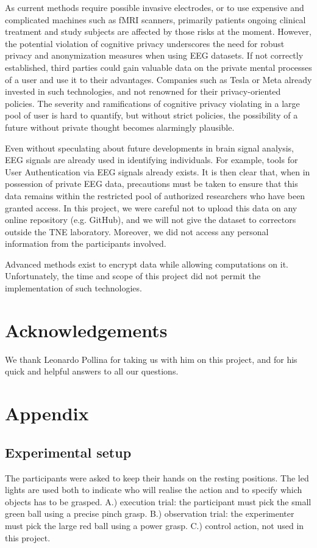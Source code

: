 \documentclass[10pt,conference,compsocconf]{IEEEtran}
\begin{document}
As current methods require possible invasive electrodes, or to use expensive and complicated machines such as fMRI scanners, primarily patients ongoing clinical treatment and study subjects are affected by those risks at the moment. However, the potential violation of cognitive privacy underscores the need for robust privacy and anonymization measures when using EEG datasets. If not correctly established, third parties could gain valuable data on the private mental processes of a user and use it to their advantages. Companies such as Tesla or Meta already invested in such technologies, and not renowned for their privacy-oriented policies. The severity and ramifications of cognitive privacy violating in a large pool of user is hard to quantify, but without strict policies, the possibility of a future without private thought becomes alarmingly plausible.

Even without speculating about future developments in brain signal analysis, EEG signals are already used in identifying individuals. For example, tools for User Authentication via EEG signals already exists\cite{10058960}. It is then clear that, when in possession of private EEG data, precautions must be taken to ensure that this data remains within the restricted pool of authorized researchers who have been granted access. In this project, we were careful not to upload this data on any online repository (e.g. GitHub), and we will not give the dataset to correctors outside the TNE laboratory. Moreover, we did not access any personal information from the participants involved.

Advanced methods exist to encrypt data while allowing computations on it\cite{app11167360}. Unfortunately, the time and scope of this project did not permit the implementation of such technologies.


\section*{Acknowledgements}
We thank Leonardo Pollina for taking us with him on this project, and for his quick and helpful answers to all our questions.

\newpage

\section{Appendix}
\subsection{Experimental setup}
The participants were asked to keep their hands on the resting positions. The led lights are used both to indicate who will realise the action and to specify which objects has to be grasped. A.) execution trial: the participant must pick the small green ball using a precise pinch grasp. B.) observation trial: the experimenter must pick the large red ball using a power grasp. C.) control action, not used in this project.
\end{document}
